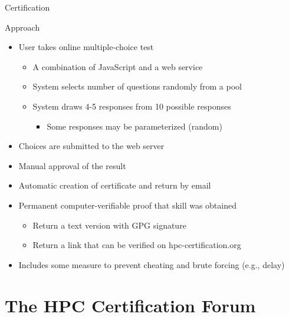 \documentclass[compress,aspectratio=169]{beamer}
\begin{document}
\begin{frame}{Certification}
	\begin{block}{Approach}
		\begin{itemize}
			\item User takes online multiple-choice test
			\begin{itemize}
				\item A combination of JavaScript and a web service
				\item System selects number of questions randomly from a pool
				\item System draws 4-5 responses from 10 possible responses
				\begin{itemize}
					\item Some responses may be parameterized (random)
				\end{itemize}
			\end{itemize}
			\item Choices are submitted to the web server
			\item Manual approval of the result
			\item Automatic creation of certificate and return by email
			\item Permanent computer-verifiable proof that skill was obtained
			\begin{itemize}
				\item Return a text version with GPG signature
				\item Return a link that can be verified on hpc-certification.org
			\end{itemize}
			\item Includes some measure to prevent cheating and brute forcing (e.g., delay)
		\end{itemize}
	\end{block}
\end{frame}


\section{The HPC Certification Forum}
\sectionIntroHidden
\end{document}

